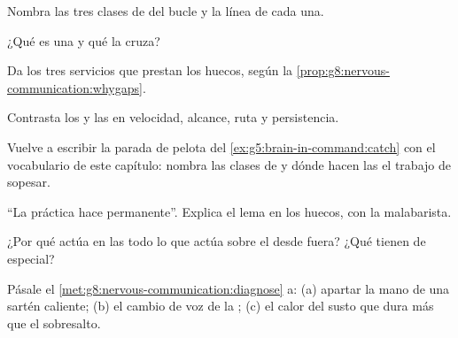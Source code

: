 \begin{exercise}[$\star$]\label{exo:g8:nervous-communication:3}
Nombra las tres clases de  del bucle y la línea de cada una.
\end{exercise}

\begin{exercise}[$\star$]\label{exo:g8:nervous-communication:4}
¿Qué es una  y qué la cruza?
\end{exercise}

\begin{exercise}[$\star$]\label{exo:g8:nervous-communication:5}
Da los tres servicios que prestan los huecos, según la
\cref{prop:g8:nervous-communication:whygaps}.
\end{exercise}

\begin{exercise}[$\star$]\label{exo:g8:nervous-communication:6}
Contrasta los  y las  en velocidad, alcance, ruta y
persistencia.
\end{exercise}

\begin{exercise}[$\star\star$]\label{exo:g8:nervous-communication:7}
Vuelve a escribir la parada de pelota del
\cref{ex:g5:brain-in-command:catch} con el vocabulario de este
capítulo: nombra las clases de  y dónde hacen las  el
trabajo de sopesar.
\end{exercise}

\begin{exercise}[$\star\star$]\label{exo:g8:nervous-communication:8}
``La práctica hace permanente''. Explica el lema en los huecos, con la
malabarista.
\end{exercise}

\begin{exercise}[$\star\star$]\label{exo:g8:nervous-communication:9}
¿Por qué actúa en las  todo lo que actúa sobre el  desde fuera? ¿Qué tienen de especial?
\end{exercise}

\begin{exercise}[$\star\star$]\label{exo:g8:nervous-communication:10}
Pásale el \cref{met:g8:nervous-communication:diagnose} a: (a) apartar
la mano de una sartén caliente; (b) el cambio de voz de la ;
(c) el calor del susto que dura más que el sobresalto.
\end{exercise}

